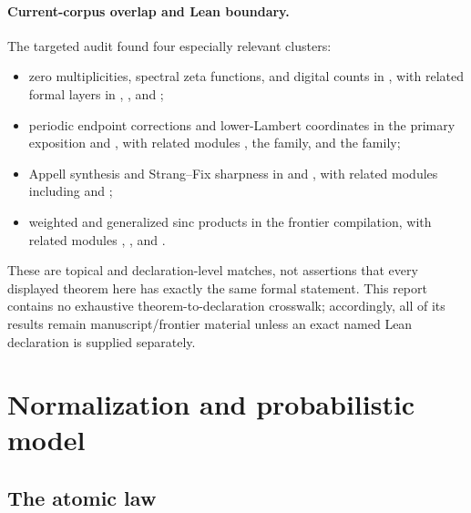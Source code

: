 \documentclass[11pt,oneside]{article}
\theoremstyle{definition}
\theoremstyle{remark}
\begin{document}
\paragraph{Current-corpus overlap and Lean boundary.}
The targeted audit found four especially relevant clusters:
\begin{itemize}[leftmargin=2em]
\item zero multiplicities, spectral zeta functions, and digital counts in
      , with related formal layers in
      ,
      , and
      ;
\item periodic endpoint corrections and lower-Lambert coordinates in the
      primary exposition and , with related
      modules , the
       family, and the
       family;
\item Appell synthesis and Strang--Fix sharpness in
       and
      , with related modules including
       and
      ;
\item weighted and generalized sinc products in the frontier compilation,
      with related modules ,
      , and
      .
\end{itemize}
These are topical and declaration-level matches, not assertions that every
displayed theorem here has exactly the same formal statement.  This report
contains no exhaustive theorem-to-declaration crosswalk; accordingly, all of
its results remain manuscript/frontier material unless an exact named Lean
declaration is supplied separately.

\section{Normalization and probabilistic model}

\subsection{The atomic law}
\end{document}
